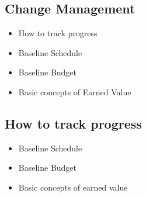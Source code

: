 \documentclass[8pt, letter]{extarticle}
\begin{document}
\begin{multicols}{2}
    \subsection{Change Management}
    \begin{itemize}
        \item How to track progress
        \item Baseline Schedule
        \item Baseline Budget
        \item Basic concepts of Earned Value
    \end{itemize}

    \subsection{How to track progress}
    \begin{itemize}
        \item Baseline Schedule
        \item Baseline Budget
        \item Basic concepts of earned value
    \end{itemize}
\end{multicols}
\end{document}

